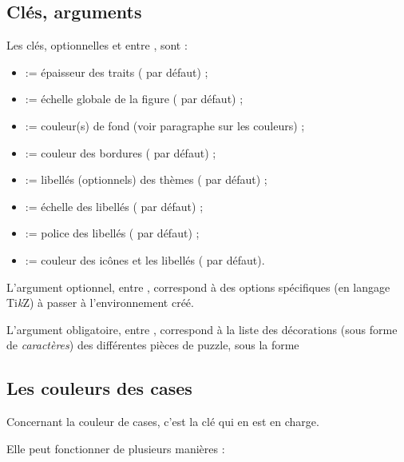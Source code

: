 \documentclass[11pt,a4paper]{ltxdoc}
\providecommand\tikzlogo{Ti\textit{k}Z}
\let\TikZ\tikzlogo
\begin{document}
\subsection{Clés, arguments}

Les \textsf{clés}, optionnelles et entre \MontreCode{[...]}, sont :

\begin{itemize}
	\item {} := épaisseur des traits (\MontreCode{1pt} par défaut) ;
	\item {} := échelle globale de la figure ( par défaut) ;
	\item {} := couleur(s) de fond (voir paragraphe sur les couleurs) ;
	\item {} := couleur des bordures ( par défaut) ;
	\item {} := libellés (optionnels) des thèmes (\MontreCode{\{\}} par défaut) ;
	\item {} := échelle des libellés ( par défaut) ;
	\item {} := police des libellés ( par défaut) ;
	\item {} := couleur des icônes et les libellés ( par défaut).
\end{itemize}

\medskip

L'argument optionnel, entre , correspond à des options spécifiques (en langage \TikZ) à passer à l'environnement créé.

\smallskip

L'argument obligatoire, entre , correspond à la liste des décorations (sous forme de \textit{caractères}) des différentes pièces de puzzle, sous la forme 

\subsection{Les couleurs des cases}

Concernant la couleur de cases, c'est la clé  qui en est en charge.

Elle peut fonctionner de plusieurs manières :
\end{document}
